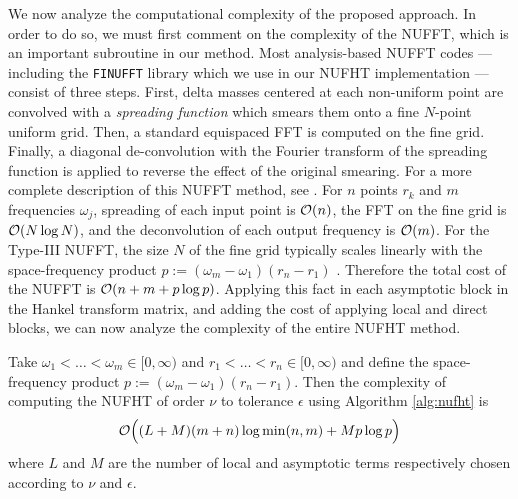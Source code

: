 We now analyze the computational complexity of the proposed approach. In order
to do so, we must first comment on the complexity of the NUFFT, which is an
important subroutine in our method. Most analysis-based NUFFT codes ---
including the \texttt{FINUFFT} library \cite{barnett2019parallel} which we use
in our NUFHT implementation --- consist of three steps. First, delta masses
centered at each non-uniform point are convolved with a \textit{spreading
function} which smears them onto a fine $N$-point uniform grid. Then, a standard
equispaced FFT is computed on the fine grid. Finally, a diagonal de-convolution
with the Fourier transform of the spreading function is applied to reverse the
effect of the original smearing. For a more complete description of this NUFFT
method, see \cite{dutt1993fast,greengard2004accelerating,barnett2019parallel}.
For $n$ points $r_k$ and $m$ frequencies $\omega_j$, spreading of each input
point is $\mathcal{O}(n)$, the FFT on the fine grid is $\mathcal{O}(N\log N)$, and the
deconvolution of each output frequency is $\mathcal{O}(m)$. For the Type-III NUFFT, the
size $N$ of the fine grid typically scales linearly with the space-frequency
product $p := (\omega_m - \omega_1)(r_n - r_1)$ \cite{barnett2019parallel,
greengard2004accelerating}. Therefore the total cost of the NUFFT is $\mathcal{O}(n + m
+ p\log p)$. Applying this fact in each asymptotic block in the Hankel transform
matrix, and adding the cost of applying local and direct blocks, we can now
analyze the complexity of the entire NUFHT method.

\begin{theorem} \label{thm:complexity} Take $\omega_1 < \dots < \omega_m \in
    [0,\infty)$ and $r_1 < \dots < r_n \in [0,\infty)$ and define the
    space-frequency product $p := (\omega_m - \omega_1)(r_n - r_1)$. Then the
    complexity of computing the NUFHT of order $\nu$ to tolerance $\epsilon$
    using Algorithm \ref{alg:nufht} is 
    $$\mathcal{O}\Big((L + M)(m + n) \log \min(n,m) + Mp\log p\Big)$$ where $L$ and $M$
    are the number of local and asymptotic terms respectively chosen according
    to $\nu$ and $\epsilon$.
\end{theorem}

